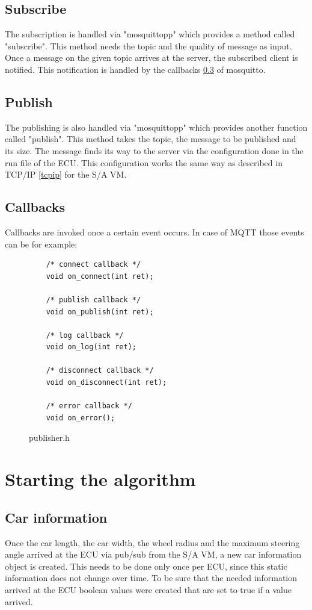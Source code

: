 \documentclass[paper=a4, fontsize=11pt]{scrreprt}
\begin{document}
  \subsection{Subscribe}
The subscription is handled via "mosquittopp" which provides a method called "subscribe". This method needs the topic and the quality of message as input. Once a message on the given topic arrives at the server, the subscribed client is notified. This notification is handled by the callbacks \ref{callbacks} of mosquitto.
  \subsection{Publish}
The publishing is also handled via "mosquittopp" which provides another function called "publish". This method takes the topic, the message to be published and its size. The message finds its way to the server via the configuration done in the run file of the ECU. This configuration works the same way as described in TCP/IP \ref{tcpip} for the S/A VM.
\newpage
  \subsection{Callbacks} \label{callbacks}
Callbacks are invoked once a certain event occurs. In case of MQTT those events can be for example:\newline
\begin{figure}[!h]
  \centering
    \begin{verbatim}
	/* connect callback */
	void on_connect(int ret);

	/* publish callback */
	void on_publish(int ret);

	/* log callback */
	void on_log(int ret);

	/* disconnect callback */
	void on_disconnect(int ret);
	
	/* error callback */
	void on_error();
    \end{verbatim}
    \caption{publisher.h}
  \end{figure}
  \section{Starting the algorithm}
  \subsection{Car information}
Once the car length, the car width, the wheel radius and the maximum steering angle arrived at the ECU via pub/sub from the S/A VM, a new car information object is created. This needs to be done only once per ECU, since this static information does not change over time.
To be sure that the needed information arrived at the ECU boolean values were created that are set to true if a value arrived.
\end{document}
